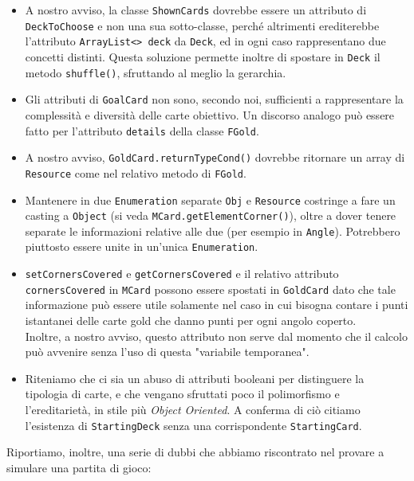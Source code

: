 \documentclass[12pt]{article}
\begin{document}
\begin{itemize}
    \item A nostro avviso, la classe \texttt{ShownCards} dovrebbe essere un attributo di \texttt{DeckToChoose} e non una sua sotto-classe, perché altrimenti erediterebbe l'attributo \texttt{ArrayList<> deck} da \texttt{Deck}, ed in ogni caso rappresentano due concetti distinti.
    Questa soluzione permette inoltre di spostare in \texttt{Deck} il metodo \texttt{shuffle()}, sfruttando al meglio la gerarchia.

    \item Gli attributi di \texttt{GoalCard} non sono, secondo noi, sufficienti a rappresentare la complessità e diversità delle carte obiettivo. Un discorso analogo può essere fatto per l'attributo \texttt{details} della classe \texttt{FGold}.

    \item A nostro avviso, \texttt{GoldCard.returnTypeCond()} dovrebbe ritornare un array di \texttt{Resource} come nel relativo metodo di \texttt{FGold}.

    \item Mantenere in due \texttt{Enumeration} separate \texttt{Obj} e \texttt{Resource} costringe a fare un casting a \texttt{Object} (si veda \texttt{MCard.getElementCorner()}), oltre a dover tenere separate le informazioni relative alle due (per esempio in \texttt{Angle}). Potrebbero piuttosto essere unite in un'unica \texttt{Enumeration}.

    \item \texttt{setCornersCovered} e \texttt{getCornersCovered} e il relativo attributo \texttt{cornersCovered} in \texttt{MCard} possono essere spostati in \texttt{GoldCard} dato che tale informazione può essere utile solamente nel caso in cui bisogna contare i punti istantanei delle carte gold che danno punti per ogni angolo coperto.\\
    Inoltre, a nostro avviso, questo attributo non serve dal momento che il calcolo può avvenire senza l'uso di questa "variabile temporanea".

    \item Riteniamo che ci sia un abuso di attributi booleani per distinguere la tipologia di carte, e che vengano sfruttati poco il polimorfismo e l'ereditarietà, in stile più \textit{Object Oriented}. A conferma di ciò citiamo l'esistenza di \texttt{StartingDeck} senza una corrispondente \texttt{StartingCard}.

\end{itemize}
\smallskip

\begin{flushleft}
Riportiamo, inoltre, una serie di dubbi che abbiamo riscontrato nel provare a simulare una partita di gioco:
\end{flushleft}
\end{document}
